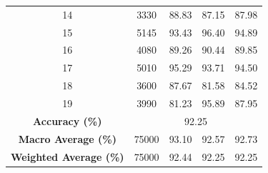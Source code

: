 \begin{table}[htbp]
{\begin{tabular}{c|c|c|c|c}
\color{black}14 & \color{black}3330  & \color{black}88.83  & \color{black}87.15 & \color{black}87.98 \\
\color{black}15 & \color{black}5145  & \color{black}93.43  & \color{black}96.40 & \color{black}94.89 \\
\color{black}16 & \color{black}4080  & \color{black}89.26  & \color{black}90.44 & \color{black}89.85 \\
\color{black}17 & \color{black}5010  & \color{black}95.29  & \color{black}93.71 & \color{black}94.50 \\
\color{black}18 & \color{black}3600  & \color{black}87.67  & \color{black}81.58 & \color{black}84.52 \\
\color{black}19 & \color{black}3990  & \color{black}81.23  & \color{black}95.89 & \color{black}87.95 \\
\hline
\color{black}\textbf{Accuracy (\%)}       & \multicolumn{4}{c|}{\color{black}92.25} \\
\color{black}\textbf{Macro Average (\%)}  & \color{black}75000   & \color{black}93.10  & \color{black}92.57 & \color{black}92.73 \\
\color{black}\textbf{Weighted Average (\%)} & \color{black}75000 & \color{black}92.44  & \color{black}92.25 & \color{black}92.25 \\
\hline
\end{tabular}%
}
\end{table}

